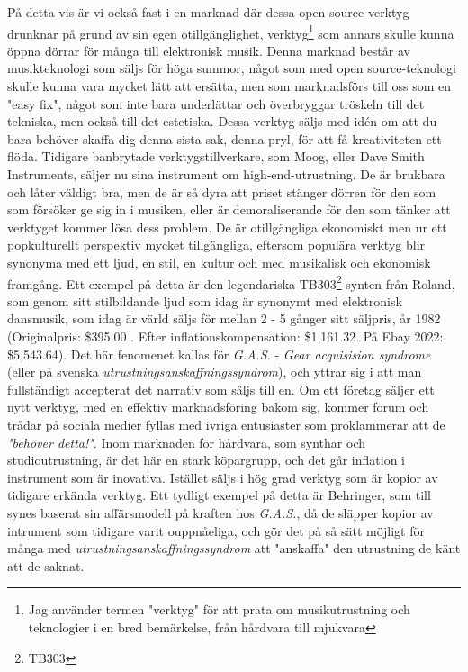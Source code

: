 \documentclass{article}
\begin{document}
På detta vis är vi också fast i en marknad där dessa open source-verktyg drunknar på grund av sin egen
otillgänglighet, verktyg\footnote{Jag använder termen "verktyg" för att prata om musikutrustning och
teknologier i en bred bemärkelse, från hårdvara till mjukvara} som annars skulle kunna öppna dörrar för många
till elektronisk musik. Denna marknad består av musikteknologi som säljs för höga summor, något som med open
source-teknologi skulle kunna vara mycket lätt att ersätta, men som marknadsförs till oss som en "easy fix",
något som inte bara underlättar och överbryggar tröskeln till det tekniska, men också till det estetiska.
Dessa verktyg säljs med idén om att du bara behöver skaffa dig denna sista sak, denna pryl, för att få
kreativiteten ett flöda.
Tidigare banbrytade verktygstillverkare, som Moog, eller Dave Smith Instruments, säljer nu sina instrument
om high-end-utrustning. De är brukbara och låter väldigt bra, men de är så dyra att priset stänger dörren för
den som som försöker ge sig in i musiken, eller är demoraliserande för den som tänker att verktyget kommer
lösa dess problem. De är otillgängliga ekonomiskt men ur ett popkulturellt perspektiv mycket tillgängliga,
eftersom populära verktyg blir synonyma med ett ljud, en stil, en kultur och med musikalisk och ekonomisk
framgång. Ett exempel på detta är den legendariska TB303\footnote{TB303}-synten från Roland, som genom sitt
stilbildande ljud som idag är synonymt med elektronisk dansmusik, som idag är värld säljs för mellan 2 - 5
gånger sitt säljpris, år 1982 (Originalpris: \$395.00 . Efter inflationskompensation: \$1,161.32. På Ebay
2022: \$5,543.64).
Det här fenomenet kallas för \emph{G.A.S.} - \emph{Gear acquisision syndrome} (eller på svenska
\emph{utrustningsanskaffningssyndrom}), och yttrar sig i att man fullständigt accepterat det narrativ som säljs
till en. Om ett företag säljer ett nytt verktyg, med en effektiv marknadsföring bakom sig, kommer forum och
trådar på sociala medier fyllas med ivriga entusiaster som proklammerar att de \emph{"behöver detta!"}. Inom
marknaden för hårdvara, som synthar och studioutrustning, är det här en stark köpargrupp, och det går
inflation i instrument som är inovativa. Istället säljs i hög grad verktyg som är kopior av tidigare erkända
verktyg. Ett tydligt exempel på detta är Behringer, som till synes baserat sin affärsmodell på kraften hos
\emph{G.A.S.}, då de släpper kopior av intrument som tidigare varit ouppnåeliga, och gör det på så sätt möjligt
för många med \emph{utrustningsanskaffningssyndrom} att "anskaffa" den utrustning de känt att de saknat. 
\end{document}
